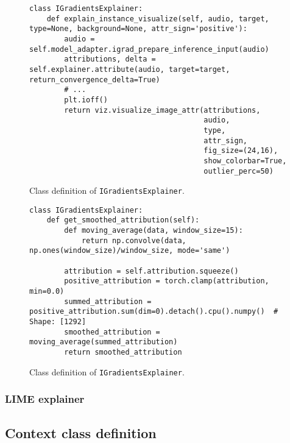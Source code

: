 \documentclass[
    bindingoffset=5mm,  %
    footnoteindent=3mm, %
    hyphenation=true    %
]{src/wut-thesis}
\begin{document}
\begin{figure}%
\begin{verbatim}
class IGradientsExplainer:
    def explain_instance_visualize(self, audio, target, type=None, background=None, attr_sign='positive'):
        audio = self.model_adapter.igrad_prepare_inference_input(audio)
        attributions, delta = self.explainer.attribute(audio, target=target, return_convergence_delta=True)
        # ...
        plt.ioff()
        return viz.visualize_image_attr(attributions,
                                        audio,
                                        type,
                                        attr_sign,
                                        fig_size=(24,16),
                                        show_colorbar=True,
                                        outlier_perc=50)
\end{verbatim}
\caption{Class definition of \texttt{IGradientsExplainer}.}
\label{fig:explain_instance_visualize}
\end{figure}

\begin{figure}%
\begin{verbatim}
class IGradientsExplainer:
    def get_smoothed_attribution(self):
        def moving_average(data, window_size=15):
            return np.convolve(data, np.ones(window_size)/window_size, mode='same')

        attribution = self.attribution.squeeze()
        positive_attribution = torch.clamp(attribution, min=0.0)
        summed_attribution = positive_attribution.sum(dim=0).detach().cpu().numpy()  # Shape: [1292]
        smoothed_attribution = moving_average(summed_attribution)
        return smoothed_attribution
\end{verbatim}
\caption{Class definition of \texttt{IGradientsExplainer}.}
\label{fig:get_smoothed_attribution}
\end{figure}

\subsubsection{LIME explainer}


\subsection{Context class definition}
\end{document}

